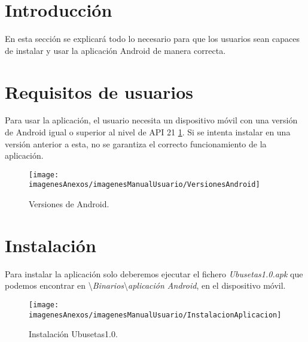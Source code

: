 
\section{Introducción}

En esta sección se explicará todo lo necesario para que los usuarios sean capaces de instalar y usar la aplicación Android de manera correcta.

\section{Requisitos de usuarios}

Para usar la aplicación, el usuario necesita un dispositivo móvil con una versión de Android igual o superior al nivel de API 21 \ref{figVersionesAndroid}. Si se intenta instalar en una versión anterior a esta, no se garantiza el correcto funcionamiento de la aplicación.

\begin{figure}[h]
    \begin{center}%
        \begin{center}%
          \texttt{[image: imagenesAnexos/imagenesManualUsuario/VersionesAndroid]}%
          \caption{Versiones de Android.}%
          \label{figVersionesAndroid}%
        \end{center}%
  	\end{center}%
\end{figure}%

\newpage
\section{Instalación}

Para instalar la aplicación solo deberemos ejecutar el fichero \textit{Ubusetas1.0.apk} que podemos encontrar en \textbackslash \textit{Binarios}\textbackslash \textit{aplicación Android}, en el dispositivo móvil.

\begin{figure}[h]
    \begin{center}%
        \begin{center}%
          \texttt{[image: imagenesAnexos/imagenesManualUsuario/InstalacionAplicacion]}%
          \caption{Instalación Ubusetas1.0.}%
          \label{figInstalacionAplicacion}%
        \end{center}%
  	\end{center}%
\end{figure}%

